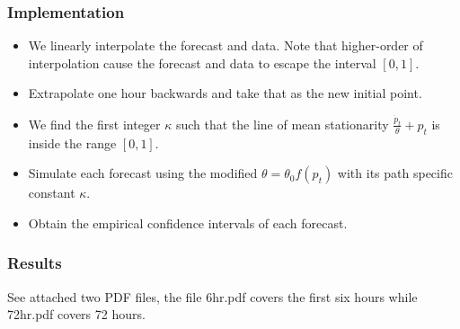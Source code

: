 \documentclass[aspectratio=169]{beamer}\usepackage[utf8]{inputenc}
\begin{document}
\begin{frame}\frametitle{ Implementation } 

\begin{itemize}
\item We linearly interpolate the forecast and data. Note that higher-order of interpolation cause the forecast and data to escape the interval $[0,1]$.
\item Extrapolate one hour backwards and take that as the new initial point.
\item We find the first integer $\kappa$ such that the line of mean stationarity $ \frac{\dot{p}_t}{\theta}  + p_t$ is inside the range $[0,1]$. 
\item Simulate each forecast using the modified $\theta = \theta_0 f(p_t)$ with its path specific constant $\kappa$.
\item Obtain the empirical  confidence intervals of each forecast.
\end{itemize}

\end{frame}


\begin{frame}\frametitle{ Results } 

See attached two PDF files, the file 6hr.pdf covers the first six hours while 72hr.pdf covers 72 hours.

\end{frame}



\end{document}
